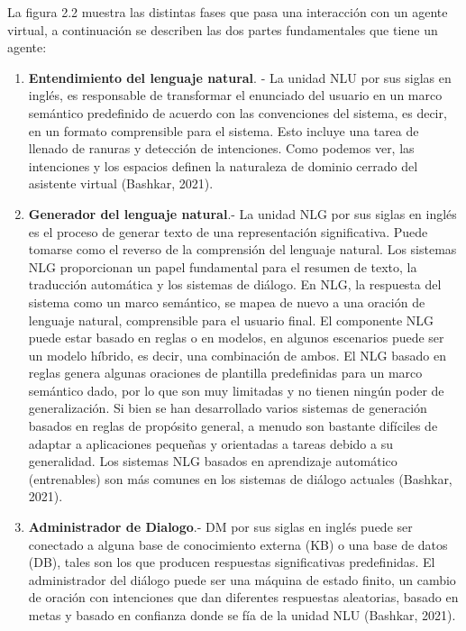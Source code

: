\documentclass[letter, openright, 12pt]{book}
\begin{document}
La figura 2.2 muestra las distintas fases que pasa una interacción con un agente virtual, a continuación se describen las dos partes fundamentales que tiene un agente: 

\begin{enumerate}[label=(\alph*)]
\item \textbf{Entendimiento del lenguaje natural}. - La unidad NLU por sus siglas en inglés, es responsable de transformar el enunciado del usuario en un marco semántico predefinido de acuerdo con las convenciones del sistema, es decir, en un formato comprensible para el sistema. Esto incluye una tarea de llenado de ranuras y detección de intenciones. Como podemos ver, las intenciones y los espacios definen la naturaleza de dominio cerrado del asistente virtual (Bashkar, 2021).

\item \textbf{Generador del lenguaje natural}.- La unidad NLG por sus siglas en inglés es el proceso de generar texto de una representación significativa. Puede tomarse como el reverso de la comprensión del lenguaje natural. Los sistemas NLG proporcionan un papel fundamental para el resumen de texto, la traducción automática y los sistemas de diálogo. En NLG, la respuesta del sistema como un marco semántico, se mapea de nuevo a una oración de lenguaje natural, comprensible para el usuario final. El componente NLG puede estar basado en reglas o en modelos, en algunos escenarios puede ser un modelo híbrido, es decir, una combinación de ambos. El NLG basado en reglas genera algunas oraciones de plantilla predefinidas para un marco semántico dado, por lo que son muy limitadas y no tienen ningún poder de generalización. Si bien se han desarrollado varios sistemas de generación basados en reglas de propósito general, a menudo son bastante difíciles de adaptar a aplicaciones pequeñas y orientadas a tareas debido a su generalidad. Los sistemas NLG basados en aprendizaje automático (entrenables) son más comunes en los sistemas de diálogo actuales (Bashkar, 2021).

\item \textbf{Administrador de Dialogo}.- DM por sus siglas en inglés puede ser conectado a alguna base de conocimiento externa (KB) o una base de datos (DB), tales son los que producen respuestas significativas predefinidas. El administrador del diálogo puede ser una máquina de estado finito, un cambio de oración con intenciones que dan diferentes respuestas aleatorias, basado en metas y basado en confianza donde se fía de la unidad NLU (Bashkar, 2021).

\end{enumerate}
\end{document}
